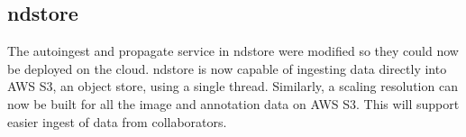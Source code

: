 \documentclass[simplex.tex]{subfiles}
\begin{document}
\subsection{ndstore}
%
%
The autoingest and propagate service in ndstore were modified so they could now be deployed on the cloud. ndstore is now capable of ingesting data directly into AWS S3, an object store, using a single thread. Similarly, a scaling resolution can now be built for all the image and annotation data on AWS S3. This will support easier ingest of data from collaborators.
%
\end{document}
